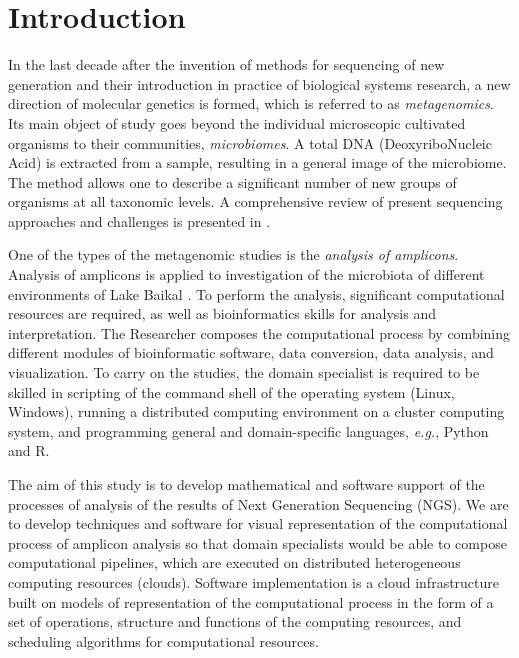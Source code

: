 \documentclass[a4paper]{jpconf}
\begin{document}

\section{Introduction}


In the last decade after the invention of methods for sequencing of new generation and their introduction in practice of biological systems research, a new direction of molecular genetics is formed, which is referred to as \emph{metagenomics}. Its main object of study goes beyond the individual microscopic cultivated organisms to their communities, \emph{microbiomes}. A total DNA (DeoxyriboNucleic Acid) is extracted from a sample, resulting in a general image of the microbiome. The method allows one to describe a significant number of new groups of organisms at all taxonomic levels. A comprehensive review of present sequencing approaches and challenges is presented in \cite{pere20}.

One of the types of the metagenomic studies is the \emph{analysis of amplicons}. Analysis of amplicons is applied to investigation of the microbiota of different environments of Lake Baikal \cite{underice}. To perform the analysis, significant computational resources are required, as well as bioinformatics skills for analysis and interpretation. The Researcher composes the computational process by combining different modules of bioinformatic software, data conversion, data analysis, and visualization. To carry on the studies, the domain specialist is required to be skilled in scripting of the command shell of the operating system (Linux, Windows), running a distributed computing environment on a cluster computing system, and programming general and domain-specific languages, \emph{e.g.}, Python and R.

The aim of this study is to develop mathematical and software support of the processes of analysis of the results of Next Generation Sequencing (NGS). We are to develop techniques and software for visual representation of the computational process of amplicon analysis so that domain specialists would be able to compose computational pipelines, which are executed on distributed heterogeneous computing resources (clouds). Software implementation is a cloud infrastructure built on models of representation of the computational process in the form of a set of operations, structure and functions of the computing resources, and scheduling algorithms for computational resources.
\end{document}
